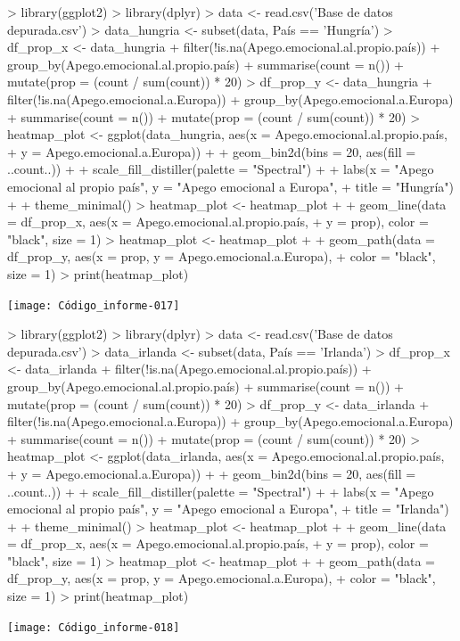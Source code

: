 \documentclass{article}
\begin{document}
\newpage
\begin{Schunk}
\begin{Sinput}
> library(ggplot2)
> library(dplyr)
> data <- read.csv('Base de datos depurada.csv')
> data_hungria <- subset(data, País == 'Hungría')
> df_prop_x <- data_hungria %
+   filter(!is.na(Apego.emocional.al.propio.país)) %
+   group_by(Apego.emocional.al.propio.país) %
+   summarise(count = n()) %
+   mutate(prop = (count / sum(count)) * 20)
> df_prop_y <- data_hungria %
+   filter(!is.na(Apego.emocional.a.Europa)) %
+   group_by(Apego.emocional.a.Europa) %
+   summarise(count = n()) %
+   mutate(prop = (count / sum(count)) * 20)
> heatmap_plot <- ggplot(data_hungria, aes(x = Apego.emocional.al.propio.país,
+                                  y = Apego.emocional.a.Europa)) +
+   geom_bin2d(bins = 20, aes(fill = ..count..)) +
+   scale_fill_distiller(palette = "Spectral") +
+   labs(x = "Apego emocional al propio país", y = "Apego emocional a Europa",
+        title = "Hungría") +
+   theme_minimal()
> heatmap_plot <- heatmap_plot +
+   geom_line(data = df_prop_x, aes(x = Apego.emocional.al.propio.país,
+                                   y = prop), color = "black", size = 1)
> heatmap_plot <- heatmap_plot +
+   geom_path(data = df_prop_y, aes(x = prop, y = Apego.emocional.a.Europa),
+             color = "black", size = 1)
> print(heatmap_plot)
\end{Sinput}
\end{Schunk}
\texttt{[image: Código\_informe-017]}

\newpage
\begin{Schunk}
\begin{Sinput}
> library(ggplot2)
> library(dplyr)
> data <- read.csv('Base de datos depurada.csv')
> data_irlanda <- subset(data, País == 'Irlanda')
> df_prop_x <- data_irlanda %
+   filter(!is.na(Apego.emocional.al.propio.país)) %
+   group_by(Apego.emocional.al.propio.país) %
+   summarise(count = n()) %
+   mutate(prop = (count / sum(count)) * 20)
> df_prop_y <- data_irlanda %
+   filter(!is.na(Apego.emocional.a.Europa)) %
+   group_by(Apego.emocional.a.Europa) %
+   summarise(count = n()) %
+   mutate(prop = (count / sum(count)) * 20)
> heatmap_plot <- ggplot(data_irlanda, aes(x = Apego.emocional.al.propio.país,
+                                  y = Apego.emocional.a.Europa)) +
+   geom_bin2d(bins = 20, aes(fill = ..count..)) +
+   scale_fill_distiller(palette = "Spectral") +
+   labs(x = "Apego emocional al propio país", y = "Apego emocional a Europa",
+        title = "Irlanda") +
+   theme_minimal()
> heatmap_plot <- heatmap_plot +
+   geom_line(data = df_prop_x, aes(x = Apego.emocional.al.propio.país,
+                                   y = prop), color = "black", size = 1)
> heatmap_plot <- heatmap_plot +
+   geom_path(data = df_prop_y, aes(x = prop, y = Apego.emocional.a.Europa),
+             color = "black", size = 1)
> print(heatmap_plot)
\end{Sinput}
\end{Schunk}
\texttt{[image: Código\_informe-018]}
\end{document}
